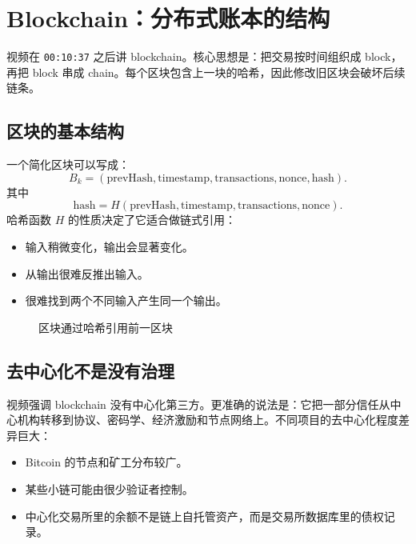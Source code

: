 \documentclass[UTF8,11pt]{ctexart}
\newcommand{\timestamp}[1]{\textcolor{blue!50!black}{\texttt{#1}}}
\begin{document}
\section{Blockchain：分布式账本的结构}

视频在 \timestamp{00:10:37} 之后讲 blockchain。核心思想是：把交易按时间组织成 block，再把 block 串成 chain。每个区块包含上一块的哈希，因此修改旧区块会破坏后续链条。

\subsection{区块的基本结构}

一个简化区块可以写成：
\[
B_k = (\text{prevHash}, \text{timestamp}, \text{transactions}, \text{nonce}, \text{hash}).
\]
其中
\[
\text{hash} = H(\text{prevHash}, \text{timestamp}, \text{transactions}, \text{nonce}).
\]
哈希函数 \(H\) 的性质决定了它适合做链式引用：
\begin{itemize}
  \item 输入稍微变化，输出会显著变化。
  \item 从输出很难反推出输入。
  \item 很难找到两个不同输入产生同一个输出。
\end{itemize}

\begin{figure}[h]
\centering
{}
\caption{区块通过哈希引用前一区块}
\end{figure}

\subsection{去中心化不是没有治理}

视频强调 blockchain 没有中心化第三方。更准确的说法是：它把一部分信任从中心机构转移到协议、密码学、经济激励和节点网络上。不同项目的去中心化程度差异巨大：
\begin{itemize}
  \item Bitcoin 的节点和矿工分布较广。
  \item 某些小链可能由很少验证者控制。
  \item 中心化交易所里的余额不是链上自托管资产，而是交易所数据库里的债权记录。
\end{itemize}
\end{document}
